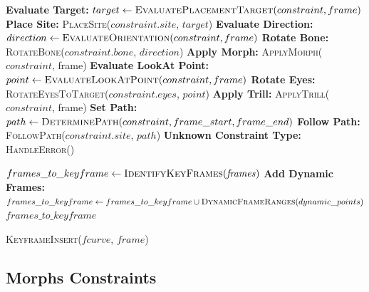 \documentclass[../../main.tex]{subfiles}
\begin{document}
\begin{algorithm}
\begin{algorithmic}[1]
                \State \textbf{Evaluate Target:} $target \gets \textsc{EvaluatePlacementTarget}(constraint, frame)$
                \State \textbf{Place Site:} \textsc{PlaceSite}($constraint.site$, $target$)
                \State \textbf{Evaluate Direction:} $direction \gets \textsc{EvaluateOrientation}(constraint, frame)$
                \State \textbf{Rotate Bone:} \textsc{RotateBone}($constraint.bone$, $direction$)
                \State \textbf{Apply Morph:} \textsc{ApplyMorph}($constraint$, frame)
                \State \textbf{Evaluate LookAt Point:} $point \gets \textsc{EvaluateLookAtPoint}(constraint, frame)$
                \State \textbf{Rotate Eyes:} \textsc{RotateEyesToTarget}($constraint.eyes$, $point$)
                \State \textbf{Apply Trill:} \textsc{ApplyTrill}($constraint$, frame)
                \State \textbf{Set Path:} $path \gets \textsc{DeterminePath}(constraint, frame\_start, frame\_end)$
                \State \textbf{Follow Path:} \textsc{FollowPath}($constraint.site$, $path$)
            \Else
                \State \textbf{Unknown Constraint Type:} \textsc{HandleError}()
            \EndIf
        \EndProcedure
        
            \State $frames\_to\_keyframe \gets \textsc{IdentifyKeyFrames}(\mathit{frames})$
                \State \textbf{Add Dynamic Frames:} $frames\_to\_keyframe \gets frames\_to\_keyframe \cup \textsc{DynamicFrameRanges}(dynamic\_points)$
            \EndIf
            \State \Return $frames\_to\_keyframe$
        \EndProcedure
        
                \State \textsc{KeyframeInsert}($fcurve$, $frame$)
            \EndFor
        \EndProcedure
    \end{algorithmic}
\end{algorithm}

\subsection{Morphs Constraints}
\end{document}
